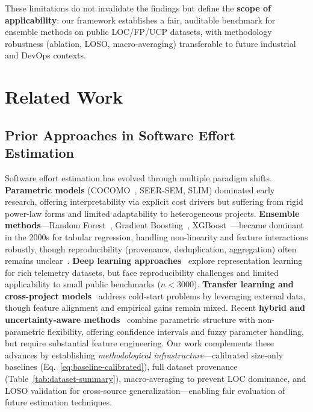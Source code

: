 \documentclass{ieeeaccess}
\begin{document}
\noindent These limitations do not invalidate the findings but define the \textbf{scope of applicability}: our framework establishes a fair, auditable benchmark for ensemble methods on public LOC/FP/UCP datasets, with methodology robustness (ablation, LOSO, macro-averaging) transferable to future industrial and DevOps contexts.




\section{Related Work}
\label{sec:related}

\subsection{Prior Approaches in Software Effort Estimation}

Software effort estimation has evolved through multiple paradigm shifts.
\textbf{Parametric models} (COCOMO~\cite{boehm1981software}, SEER-SEM, SLIM) dominated early research, offering interpretability via explicit cost drivers but suffering from rigid power-law forms and limited adaptability to heterogeneous projects.
\textbf{Ensemble methods}—Random Forest~\cite{breiman2001random}, Gradient Boosting~\cite{friedman2001greedy}, XGBoost~\cite{chen2016xgboost}—became dominant in the 2000s for tabular regression, handling non-linearity and feature interactions robustly, though reproducibility (provenance, deduplication, aggregation) often remains unclear~\cite{pandey2023comprehensive}.
\textbf{Deep learning approaches}~\cite{choetkiertikul2018deep,alqadi2021deep} explore representation learning for rich telemetry datasets, but face reproducibility challenges and limited applicability to small public benchmarks ($n{<}3000$).
\textbf{Transfer learning and cross-project models}~\cite{kocaguneli2013exploiting} address cold-start problems by leveraging external data, though feature alignment and empirical gains remain mixed.
Recent \textbf{hybrid and uncertainty-aware methods}~\cite{liu2024fuzzy,wang2025pattern,zhang2024uncertainty,chen2025hybrid} combine parametric structure with non-parametric flexibility, offering confidence intervals and fuzzy parameter handling, but require substantial feature engineering.
Our work complements these advances by establishing \emph{methodological infrastructure}—calibrated size-only baselines (Eq.~\ref{eq:baseline-calibrated}), full dataset provenance (Table~\ref{tab:dataset-summary}), macro-averaging to prevent LOC dominance, and LOSO validation for cross-source generalization—enabling fair evaluation of future estimation techniques.
\end{document}
